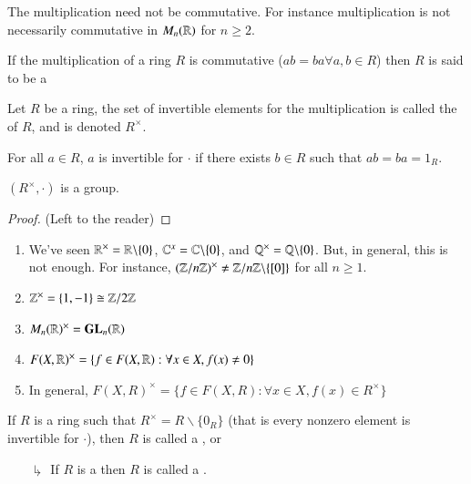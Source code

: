 \documentclass[12pt, a4paper, oneside, openright, titlepage]{book}
\begin{document}
\begin{note}
    The multiplication need not be commutative. For instance multiplication is not necessarily commutative in $M_n(\mathbb R)$ for $n \geq 2$.
\end{note}


\begin{defn}
    If the multiplication of a ring $R$ is commutative ($ab = ba \forall a,b\in R$) then $R$ is said to be a 
\end{defn}


\begin{defn}
    Let $R$ be a ring, the set of invertible elements for the multiplication is called the  of $R$, and is denoted $R^{\times}$.
\end{defn}

\begin{rec}
    For all $a \in R$, $a$ is invertible for $\cdot$ if there exists $b \in R$ such that $ab = ba = 1_R$.
\end{rec}

\begin{xca}
    $(R^{\times}, \cdot)$ is a group.
    \begin{proof}
        (Left to the reader)
    \end{proof}
\end{xca}

\begin{eg}
    \leavevmode
    \begin{enumerate}
        \item We've seen $\mathbb R^{\times} = \mathbb R\backslash\{0\}$, $\mathbb C^{x} = \mathbb C\backslash\{0\}$, and $\mathbb Q^{\times} = \mathbb Q\backslash\{0\}$. But, in general, this is not enough. For instance, $(\mathbb Z/n\mathbb Z)^{\times} \neq \mathbb Z/n\mathbb Z\backslash\{[0]\}$ for all $n \geq 1$.
        \item $\mathbb Z^{\times} = \{1,-1\}\cong  \mathbb Z/2\mathbb Z$
        \item $M_n(\mathbb R)^{\times} = \mathbf{GL}_n(\mathbb R)$
        \item $F(X,\mathbb R)^{\times} = \{f\in F(X,\mathbb R):\forall x \in X, f(x) \neq 0\}$
        \item In general, $F(X,R)^{\times} = \{f \in F(X,R):\forall x \in X, f(x) \in R^{\times}\}$
    \end{enumerate}
\end{eg}

\begin{defn}
    If $R$ is a ring such that $R^{\times} = R\backslash\{0_R\}$ (that is every nonzero element is invertible for $\cdot$), then $R$ is called a , or 
    \begin{enumerate}
        \item[$\drsh$] If $R$ is a  then $R$ is called a . 
    \end{enumerate}
\end{defn}
\end{document}
